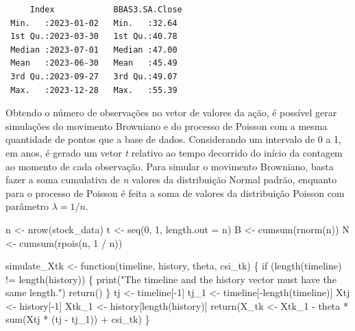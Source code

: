 \documentclass[
  letterpaper,
  DIV=11,
  numbers=noendperiod]{scrreprt}
\newenvironment{Shaded}{\begin{snugshade}}{\end{snugshade}}
\newcommand{\AttributeTok}[1]{\textcolor[rgb]{0.40,0.45,0.13}{#1}}
\newcommand{\ControlFlowTok}[1]{\textcolor[rgb]{0.00,0.23,0.31}{#1}}
\newcommand{\DecValTok}[1]{\textcolor[rgb]{0.68,0.00,0.00}{#1}}
\newcommand{\FunctionTok}[1]{\textcolor[rgb]{0.28,0.35,0.67}{#1}}
\newcommand{\NormalTok}[1]{\textcolor[rgb]{0.00,0.23,0.31}{#1}}
\newcommand{\OtherTok}[1]{\textcolor[rgb]{0.00,0.23,0.31}{#1}}
\newcommand{\SpecialCharTok}[1]{\textcolor[rgb]{0.37,0.37,0.37}{#1}}
\newcommand{\StringTok}[1]{\textcolor[rgb]{0.13,0.47,0.30}{#1}}
\begin{document}
\begin{verbatim}
     Index            BBAS3.SA.Close 
 Min.   :2023-01-02   Min.   :32.64  
 1st Qu.:2023-03-30   1st Qu.:40.78  
 Median :2023-07-01   Median :47.00  
 Mean   :2023-06-30   Mean   :45.49  
 3rd Qu.:2023-09-27   3rd Qu.:49.07  
 Max.   :2023-12-28   Max.   :55.39  
\end{verbatim}

Obtendo o número de observações no vetor de valores da ação, é possível
gerar simulações do movimento Browniano e do processo de Poisson com a
mesma quantidade de pontos que a base de dados. Considerando um
intervalo de 0 a 1, em anos, é gerado um vetor \emph{t} relativo ao
tempo decorrido do início da contagem ao momento de cada observação.
Para simular o movimento Browniano, basta fazer a soma cumulativa de
\emph{n} valores da distribuição Normal padrão, enquanto para o processo
de Poisson é feita a soma de valores da distribuição Poisson com
parâmetro \(\lambda=1/n\).

\begin{Shaded}
\begin{Highlighting}[]
\NormalTok{n }\OtherTok{\textless{}{-}} \FunctionTok{nrow}\NormalTok{(stock\_data)}
\NormalTok{t }\OtherTok{\textless{}{-}} \FunctionTok{seq}\NormalTok{(}\DecValTok{0}\NormalTok{, }\DecValTok{1}\NormalTok{, }\AttributeTok{length.out =}\NormalTok{ n)}
\NormalTok{B }\OtherTok{\textless{}{-}} \FunctionTok{cumsum}\NormalTok{(}\FunctionTok{rnorm}\NormalTok{(n))}
\NormalTok{N }\OtherTok{\textless{}{-}} \FunctionTok{cumsum}\NormalTok{(}\FunctionTok{rpois}\NormalTok{(n, }\DecValTok{1} \SpecialCharTok{/}\NormalTok{ n))}
\end{Highlighting}
\end{Shaded}

\begin{Shaded}
\begin{Highlighting}[]
\NormalTok{simulate\_Xtk }\OtherTok{\textless{}{-}} \ControlFlowTok{function}\NormalTok{(timeline, history, theta, csi\_tk) \{}
    \ControlFlowTok{if}\NormalTok{ (}\FunctionTok{length}\NormalTok{(timeline) }\SpecialCharTok{!=} \FunctionTok{length}\NormalTok{(history)) \{}
        \FunctionTok{print}\NormalTok{(}\StringTok{"The timeline and the history vector must have the same length."}\NormalTok{)}
        \FunctionTok{return}\NormalTok{()}
\NormalTok{    \}}
\NormalTok{    tj }\OtherTok{\textless{}{-}}\NormalTok{ timeline[}\SpecialCharTok{{-}}\DecValTok{1}\NormalTok{]}
\NormalTok{    tj\_1 }\OtherTok{\textless{}{-}}\NormalTok{ timeline[}\SpecialCharTok{{-}}\FunctionTok{length}\NormalTok{(timeline)]}
\NormalTok{    Xtj }\OtherTok{\textless{}{-}}\NormalTok{ history[}\SpecialCharTok{{-}}\DecValTok{1}\NormalTok{]}
\NormalTok{    Xtk\_1 }\OtherTok{\textless{}{-}}\NormalTok{ history[}\FunctionTok{length}\NormalTok{(history)]}
    \FunctionTok{return}\NormalTok{(X\_tk }\OtherTok{\textless{}{-}}\NormalTok{ Xtk\_1 }\SpecialCharTok{{-}}\NormalTok{ theta }\SpecialCharTok{*} \FunctionTok{sum}\NormalTok{(Xtj }\SpecialCharTok{*}\NormalTok{ (tj }\SpecialCharTok{{-}}\NormalTok{ tj\_1)) }\SpecialCharTok{+}\NormalTok{ csi\_tk)}
\NormalTok{\}}
\end{Highlighting}
\end{Shaded}




\printindex
\end{document}
